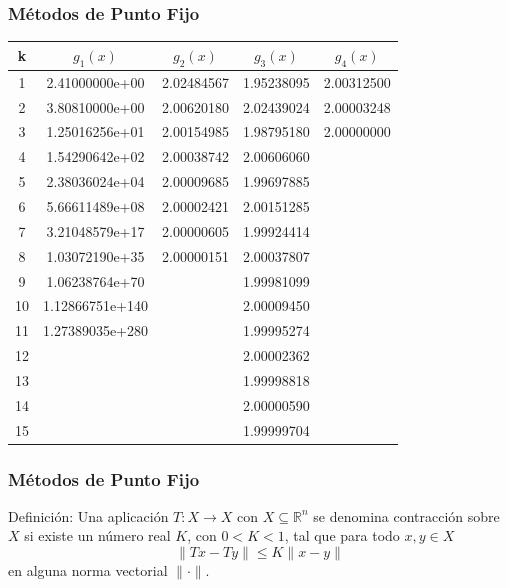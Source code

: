 \documentclass{beamer}
\begin{document}
\begin{frame}
  \frametitle{M\'etodos de Punto Fijo}
  \begin{center}
    \small{
    \begin{tabular}{|c|c|c|c|c|}\hline
    k & $g_1(x)$ & $g_2(x)$ & $g_3(x)$ & $g_4(x)$ \\\hline\hline 
    1 & 2.41000000e+00 & 2.02484567 & 1.95238095 & 2.00312500\\\hline
    2 & 3.80810000e+00 & 2.00620180 & 2.02439024 & 2.00003248\\\hline
    3 & 1.25016256e+01 & 2.00154985 & 1.98795180 & 2.00000000 \\\hline
    4 & 1.54290642e+02 & 2.00038742 & 2.00606060 & \\\hline
    5 & 2.38036024e+04 & 2.00009685 & 1.99697885 & \\\hline
    6 & 5.66611489e+08 & 2.00002421 & 2.00151285 & \\\hline
    7 & 3.21048579e+17 & 2.00000605 & 1.99924414 & \\\hline
    8 & 1.03072190e+35 & 2.00000151 & 2.00037807 & \\\hline
    9 & 1.06238764e+70 & & 1.99981099 & \\\hline
    10 & 1.12866751e+140 & & 2.00009450 & \\\hline
    11 & 1.27389035e+280 & & 1.99995274 & \\\hline
    12 & & & 2.00002362 & \\\hline
    13 & & & 1.99998818 & \\\hline
    14 & & & 2.00000590 & \\\hline
    15 & & & 1.99999704 & \\\hline
    \end{tabular}}
  \end{center}
\end{frame}
\begin{frame}
  \frametitle{M\'etodos de Punto Fijo}
  \begin{block}{Definici\'on:}
    Una aplicaci\'on $T : X \to X$ con $X \subseteq \mathbb{R}^n$ se denomina contracci\'on sobre $X$ si existe un n\'umero
real $K$, con $0 < K < 1$, tal que para todo $x, y \in X$
$$
\|Tx - Ty\| \leq K \|x - y\|
$$
en alguna norma vectorial $\|\cdot\|$.
  \end{block}
\end{frame}
\end{document}
